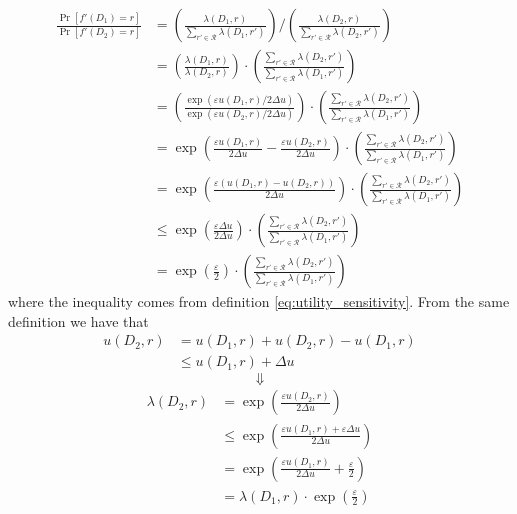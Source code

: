 \documentclass[a4paper,12pt]{article}
\newcommand{\fancy}{\mathcal}
\renewcommand{\epsilon}{\varepsilon}
\begin{document}
\begin{align}
    \frac{\Pr[f'(D_1) = r]}{\Pr[f'(D_2) = r]} &= 
                \left( \frac{\lambda(D_1,r)}{\sum_{r' \in \fancy{R}} \lambda(D_1,r')} \right)
                /
                \left( \frac{\lambda(D_2,r)}{\sum_{r' \in \fancy{R}} \lambda(D_2,r')} \right) \nonumber\\
            &= \left( \frac{\lambda(D_1,r)}{\lambda(D_2,r)} \right) \cdot \left( \frac{\sum_{r'\in\fancy{R}} \lambda(D_2,r')}{\sum_{r'\in\fancy{R}} \lambda(D_1,r')} \right) \nonumber\\
            &= \left( \frac{\exp(\epsilon u(D_1,r)/2\Delta u)}{\exp(\epsilon u(D_2,r)/2\Delta u)} \right) \cdot \left( \frac{\sum_{r'\in\fancy{R}} \lambda(D_2,r')}{\sum_{r'\in\fancy{R}} \lambda(D_1,r')} \right) \nonumber\\
            &= \exp \left( \frac{\epsilon u(D_1,r)}{2\Delta u} - \frac{\epsilon u(D_2,r)}{2\Delta u} \right) \cdot \left( \frac{\sum_{r'\in\fancy{R}} \lambda(D_2,r')}{\sum_{r'\in\fancy{R}} \lambda(D_1,r')} \right) \nonumber\\
            &= \exp \left( \frac{\epsilon (u(D_1,r) - u(D_2,r))}{2\Delta u}\right) \cdot \left( \frac{\sum_{r'\in\fancy{R}} \lambda(D_2,r')}{\sum_{r'\in\fancy{R}} \lambda(D_1,r')} \right) \nonumber\\
            &\leq \exp \left( \frac{\epsilon \Delta u}{2\Delta u}\right) \cdot \left( \frac{\sum_{r'\in\fancy{R}} \lambda(D_2,r')}{\sum_{r'\in\fancy{R}} \lambda(D_1,r')} \right) \nonumber\\
            &= \exp \left( \frac{\epsilon}{2} \right) \cdot \left( \frac{\sum_{r'\in\fancy{R}} \lambda(D_2,r')}{\sum_{r'\in\fancy{R}} \lambda(D_1,r')} \right) \label{eq:expmech}
\end{align}
where the inequality comes from definition \ref{eq:utility_sensitivity}. From the same definition we have that
\begin{align*}
    u(D_2,r) &= u(D_1,r) + u(D_2,r) - u(D_1,r) \\
        &\leq u(D_1,r) + \Delta u
\end{align*}
$$\Downarrow$$
\begin{align*}
    \lambda(D_2,r) &= \exp\left( \frac{\epsilon u(D_2,r)}{2\Delta u} \right) \\
        &\leq \exp\left( \frac{\epsilon u(D_1,r) + \epsilon\Delta u}{2\Delta u} \right) \\
        &= \exp\left( \frac{\epsilon u(D_1,r)}{2\Delta u} + \frac{\epsilon}{2} \right) \\
        &= \lambda(D_1,r) \cdot \exp \left( \frac{\epsilon}{2} \right)
\end{align*}
\end{document}
